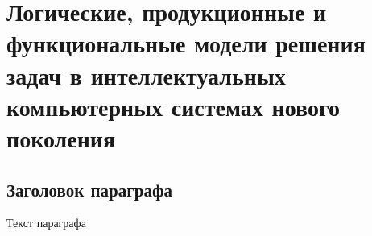 
\chapter{Логические, продукционные и функциональные модели решения задач в интеллектуальных компьютерных системах нового поколения}
\label{chapter_logic_productions}


\section{Заголовок параграфа}
Текст параграфа

%